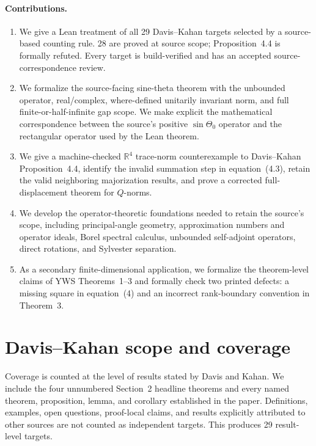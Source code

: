 \documentclass[11pt]{article}
\newcommand{\DKResultCount}{29}
\newcommand{\DKProvedCount}{28}
\begin{document}
\paragraph{Contributions.}
\begin{enumerate}
  \item We give a Lean treatment of all \DKResultCount{} Davis--Kahan targets
        selected by a source-based counting rule.  \DKProvedCount{} are proved
        at source scope; Proposition~4.4 is formally refuted.  Every target is
        build-verified and has an accepted source-correspondence review.
  \item We formalize the source-facing sine-theta theorem with the unbounded
        operator, real/complex, where-defined unitarily invariant norm, and full
        finite-or-half-infinite gap scope.  We make explicit the mathematical
        correspondence between the source's positive $\sin\Theta_0$ operator
        and the rectangular operator used by the Lean theorem.
  \item We give a machine-checked $\mathbb{R}^4$ trace-norm counterexample to
        Davis--Kahan Proposition~4.4, identify the invalid summation step in
        equation~(4.3), retain the valid neighboring majorization results, and
        prove a corrected full-displacement theorem for $Q$-norms.
  \item We develop the operator-theoretic foundations needed to retain the
        source's scope, including principal-angle geometry, approximation
        numbers and operator ideals, Borel spectral calculus, unbounded
        self-adjoint operators, direct rotations, and Sylvester separation.
  \item As a secondary finite-dimensional application, we formalize the
        theorem-level claims of YWS Theorems~1--3 and formally check two printed
        defects: a missing square in equation~(4) and an incorrect rank-boundary
        convention in Theorem~3.
\end{enumerate}

\section{Davis--Kahan scope and coverage}
\label{sec:coverage}

Coverage is counted at the level of results stated by Davis and Kahan.  We
include the four unnumbered Section~2 headline
theorems and every named theorem, proposition, lemma, and corollary established
in the paper.  Definitions, examples, open questions, proof-local claims, and
results explicitly attributed to other sources are not counted as independent
targets.  This produces \DKResultCount{} result-level targets.
\end{document}
